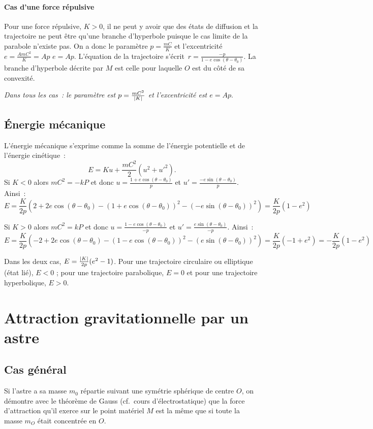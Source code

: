 \paragraph{Cas d'une force répulsive}%
Pour une force répulsive, \(K > 0\), il ne peut y avoir que des états de 
diffusion et la trajectoire ne peut être qu'une branche d'hyperbole puisque le 
cas limite de la parabole n'existe pas. On a donc le paramètre \(p = 
\frac{mC}{K}\) et l'excentricité \(e = \frac{AmC^2}{K} = Ap\) \(e = Ap\). %
L'équation de la trajectoire s'écrit~\(r = \frac{-p}{1 - e\cos(\theta - 
\theta_0)}\). La branche d'hyperbole décrite par \(M\) est celle pour laquelle 
\(O\) est du côté de sa convexité.

\emph{Dans tous les cas~: le paramètre est \(p=\frac{mC^2}{\left\lvert K\right\rvert}\) et %
l'excentricité est \(e = Ap\)}.

\subsection{Énergie mécanique}%
L'énergie mécanique s'exprime comme la somme de l'énergie potentielle et de 
l'énergie cinétique~: \[E = Ku + \frac{mC^2}{2}(u^2 + {u'}^2).\]
Si \(K<0\) alors \(mC^2 = -kP\) et donc \(u = \frac{1+e\cos(\theta - 
\theta_0)}{p}\) et \(u' = \frac{-e\sin(\theta - \theta_0)}{p}\). Ainsi~:
\[E = \frac{K}{2p}\left(2+2e\cos(\theta-\theta_0) - 
{(1+e\cos(\theta-\theta_0))}^2 - {(-e\sin(\theta-\theta_0))}^2\right) = 
\frac{K}{2p}(1-e^2)\]%

Si \(K>0\) alors \(mC^2 = kP\) et donc \(u = \frac{1-e\cos(\theta - 
\theta_0)}{-p}\) et \(u' = \frac{e\sin(\theta - \theta_0)}{-p}\). Ainsi~:
\[E = \frac{K}{2p}\left(-2+2e\cos(\theta-\theta_0) - 
{(1-e\cos(\theta-\theta_0))}^2 - {(e\sin(\theta-\theta_0))}^2\right) = 
\frac{K}{2p}(-1+e^2) = -\frac{K}{2p}(1-e^2)\]%

Dans les deux cas, \(E = \frac{\left\lvert K\right\rvert}{2p}(e^2-1)\). Pour une trajectoire 
circulaire ou elliptique (état lié), \(E<0\) ; pour une trajectoire 
parabolique, \(E=0\) et pour une trajectoire hyperbolique, \(E>0\).

\section{Attraction gravitationnelle par un astre}%
\subsection{Cas général}%

Si l'astre a sa masse \(m_0\) répartie suivant une symétrie sphérique de centre 
\(O\), on démontre avec le théorème de Gauss (cf.\ cours d'électrostatique) que 
la force d'attraction qu'il exerce sur le point matériel \(M\) est la même que 
si toute la masse \(m_O\) était concentrée en \(O\).

